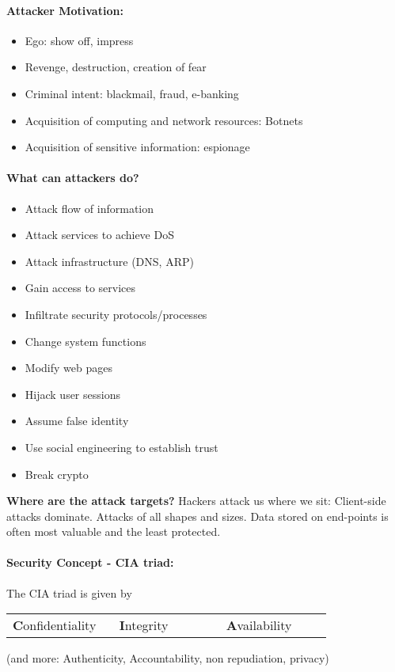 \paragraph{Attacker Motivation:}
\begin{itemize}
\item Ego: show off, impress
\item Revenge, destruction, creation of fear
\item Criminal intent: blackmail, fraud, e-banking
\item Acquisition of computing and network
resources: Botnets
\item Acquisition of sensitive information:
espionage
\end{itemize}

\paragraph{What can attackers do?}
\begin{itemize}
\item Attack flow of information
\item Attack services to achieve DoS
\item Attack infrastructure (DNS, ARP)
\item Gain access to services
\item Infiltrate security protocols/processes
\item Change system functions
\item Modify web pages
\item Hijack user sessions
\item Assume false identity
\item Use social engineering to establish trust
\item Break crypto
\end{itemize}

\textbf{Where are the attack targets?} Hackers attack us where we sit: Client-side
attacks dominate. Attacks of all shapes and
sizes. Data stored on end-points is often
most valuable and the least protected.

\paragraph{Security Concept - CIA triad:} The CIA triad is given by

\begin{tabular}{p{0.3\linewidth}p{0.3\linewidth}p{0.3\linewidth}}
\textbf{C}onfidentiality & \textbf{I}ntegrity & \textbf{A}vailability \\
\end{tabular}
(and more: Authenticity, Accountability, non
repudiation, privacy)

